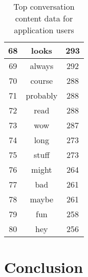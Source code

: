 \begin{table}[!htbp]
\begin{minipage}[b]{.5\textwidth}
\begin{tabular}{|c|c|c|}
		68 & looks & 293 \\ \hline
		69 & always & 292 \\ \hline
		70 & course & 288 \\ \hline
		71 & probably & 288 \\ \hline
		72 & read & 288 \\ \hline
		73 & wow & 287 \\ \hline
		74 & long & 273 \\ \hline
		75 & stuff & 273 \\ \hline
		76 & might & 264 \\ \hline
		77 & bad & 261 \\ \hline
		78 & maybe & 261 \\ \hline
		79 & fun & 258 \\ \hline
		80 & hey & 256 \\ \hline
	\end{tabular}
\end{minipage}
	\caption{Top conversation content data for application users}
	\label{tab:revpol}
\end{table}








\section{Conclusion}
\label{sec:AFconc}

